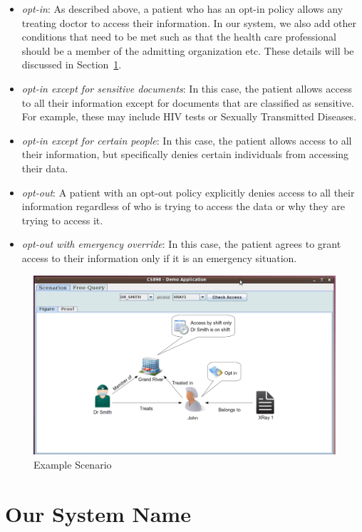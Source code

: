 \documentclass[conference]{IEEEtran}
\begin{document}
\begin{itemize}
 \item \textit{opt-in}: As described above, a patient who has an opt-in policy allows any treating doctor to access their information. In our system, we also
add other conditions that need to be met such as that the health care professional should be a member of the admitting organization etc. These details will be
discussed in Section~\ref{main-sys}.
\item \textit{opt-in except for sensitive documents}: In this case, the patient allows access to all their information except for documents that are classified
as sensitive. For example, these may include HIV tests or Sexually Transmitted Diseases. 
\item \textit{opt-in except for certain people}: In this case, the patient allows access to all their information, but specifically denies certain individuals
from accessing their data.
\item \textit{opt-out}: A patient with an opt-out policy explicitly denies access to all their information regardless of who is trying to access the data or
why they are trying to access it.
\item \textit{opt-out with emergency override}: In this case, the patient agrees to grant access to their information only if it is an emergency situation. 
\end{itemize}

\begin{figure}[!t]
 \centering
 \includegraphics[scale=0.25,keepaspectratio=true]{./main.png}
 \caption{Example Scenario}
 \label{fig:mainscreen}
\end{figure}


\section{Our System Name}
\label{main-sys}
\end{document}

